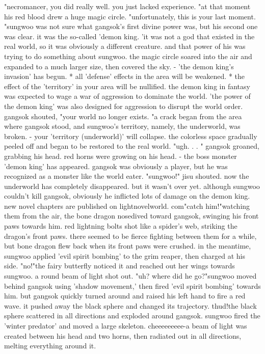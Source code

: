 "necromancer, you did really well.
 you just lacked experience.
"at that moment his red blood drew a huge magic circle.
"unfortunately, this is your last moment.
"sungwoo was not sure what gangsok's first divine power was, but his second one was clear.
 it was the so-called 'demon king.
'it was not a god that existed in the real world, so it was obviously a different creature.
 and that power of his was trying to do something about sungwoo.
the magic circle soared into the air and expanded to a much larger size, then covered the sky.
- 'the demon king's invasion' has begun.
* all 'defense' effects in the area will be weakened.
* the effect of the 'territory' in your area will be nullified.
the demon king in fantasy was expected to wage a war of aggression to dominate the world.
'the power of the demon king' was also designed for aggression to disrupt the world order.
gangsok shouted, "your world no longer exists.
"a crack began from the area where gangsok stood, and sungwoo's territory, namely, the underworld, was broken.
- your 'territory (underworld)' will collapse.
the colorless space gradually peeled off and began to be restored to the real world.
"ugh.
.
.
"
gangsok groaned, grabbing his head.
 red horns were growing on his head.
- the boss monster 'demon king' has appeared.
gangsok was obviously a player, but he was recognized as a monster like the world eater.
"sungwoo!" jisu shouted.
now the underworld has completely disappeared.
but it wasn't over yet.
 although sungwoo couldn't kill gangsok, obviously he inflicted lots of damage on the demon king.
new novel chapters are published on lightnovelworld.
com"catch him!"watching them from the air, the bone dragon nosedived toward gangsok, swinging his front paws towards him.
red lightning bolts shot like a spider's web, striking the dragon's front paws.
 there seemed to be fierce fighting between them for a while, but bone dragon flew back when its front paws were crushed.
in the meantime, sungwoo applied 'evil spirit bombing' to the grim reaper, then charged at his side.
"no!"the fairy butterfly noticed it and reached out her wings towards sungwoo.
a round beam of light shot out.
"uh? where did he go?"sungwoo moved behind gangsok using 'shadow movement,' then fired 'evil spirit bombing' towards him.
but gangsok quickly turned around and raised his left hand to fire a red wave.
 it pushed away the black sphere and changed its trajectory.
thud!the black sphere scattered in all directions and exploded around gangsok.
sungwoo fired the 'winter predator' and moved a large skeleton.
cheeeeeeeee-a beam of light was created between his head and two horns, then radiated out in all directions, melting everything around it.
